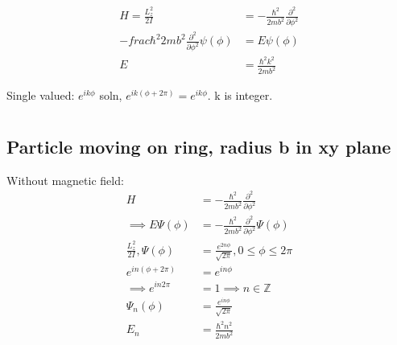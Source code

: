 \documentclass[a4paper, 11pt, normalem]{report}
\begin{document}
\begin{align}
    H = \frac{L_z^2}{2I} &= -\frac{\hbar^2}{2mb^2}\frac{\partial^2}{\partial \phi^2} \\
    -frac{\hbar^2}{2mb^2}\frac{\partial^2}{\partial \phi^2}\psi(\phi) &= E\psi(\phi) \\
    E &= \frac{\hbar^2 k^2}{2mb^2}
\end{align}

Single valued: $e^{ik\phi}$ soln, $e^{ik(\phi + 2\pi)} = e^{ik\phi}$. k is integer.

\chapter{}
\section{Particle moving on ring, radius b in xy plane}

Without magnetic field:
\begin{align}
    H &= -\frac{\hbar^2}{2mb^2}\frac{\partial^2}{\partial\phi^2} \\
    \implies E\Psi(\phi) &= -\frac{\hbar^2}{2mb^2}\frac{\partial^2}{\partial\phi^2}\Psi(\phi) \\
    \frac{L_z^2}{2I}, \Psi(\phi) &= \frac{e^{2n\phi}}{\sqrt{2\pi}}, 0 \leq \phi \leq 2\pi \\
    e^{in(\phi+2\pi)} &= e^{in\phi} \\
    \implies e^{in2\pi} &= 1 \implies n \in \mathbb{Z} \\
    \Psi_n(\phi) &= \frac{e^{in\phi}}{\sqrt{2\pi}} \\
    E_n &= \frac{\hbar^2n^2}{2mb^2}
\end{align}
\end{document}
